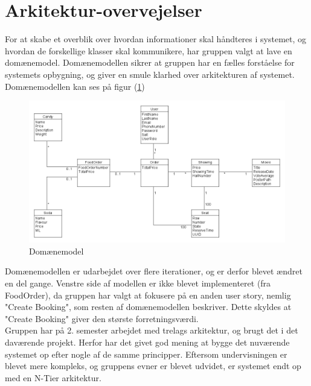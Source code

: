 \section{Arkitektur-overvejelser}\label{sec:arkitektur}
For at skabe et overblik over hvordan informationer skal håndteres i systemet,
og hvordan de forskellige klasser skal kommunikere, har gruppen valgt at lave en domænemodel.
Domænemodellen sikrer at gruppen har en fælles forståelse for systemets opbygning,
og giver en smule klarhed over arkitekturen af systemet.\\

Domænemodellen kan ses på figur (\ref{fig:domain})

\begin{figure}[H]
    \centering
    \includegraphics[width=1\textwidth]{figures/Domainmodel.png}
    \caption{Domænemodel}
    \label{fig:domain}
\end{figure}

Domænemodellen er udarbejdet over flere iterationer, og er derfor blevet ændret en del gange.
Venstre side af modellen er ikke blevet implementeret (fra FoodOrder), da gruppen har valgt at fokusere på
en anden user story, nemlig "Create Booking", som resten af domænemodellen beskriver. Dette skyldes at "Create Booking"
giver den største forretningsværdi. \\

Gruppen har på 2. semester arbejdet med trelags arkitektur, og brugt det i det daværende projekt.
Herfor har det givet god mening at bygge det nuværende systemet op efter nogle af de samme principper.
Eftersom undervisningen er blevet mere kompleks, og gruppens evner er blevet udvidet, er systemet endt op med en
N-Tier arkitektur.\\

